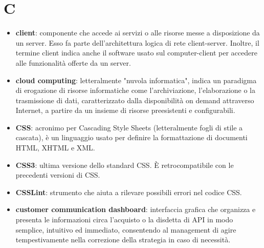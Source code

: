\section{C}
\begin{itemize}
	\item \textbf{client}: componente che accede ai servizi o alle risorse messe a disposizione da un server. Esso fa parte dell'architettura logica di rete client-server. Inoltre, il termine client indica anche il software usato sul computer-client per accedere alle funzionalità offerte da un server.
	\item \textbf{cloud computing}: letteralmente "nuvola informatica", indica un paradigma di erogazione di risorse informatiche come l'archiviazione, l'elaborazione o la trasmissione di dati, caratterizzato dalla disponibilità on demand attraverso Internet, a partire da un insieme di risorse preesistenti e configurabili.
	\item \textbf{CSS}: acronimo per Cascading Style Sheets (letteralmente fogli di stile a cascata), è un linguaggio usato per definire la formattazione di documenti HTML, XHTML e XML.
	\item \textbf{CSS3}: ultima versione dello standard CSS. \MakeUppercase{è} retrocompatibile con le precedenti versioni di CSS.
	\item \textbf{CSSLint}: strumento che aiuta a rilevare possibili errori nel codice CSS.
	\item \textbf{customer communication dashboard}: interfaccia grafica che organizza e presenta le informazioni circa l'acquisto o la disdetta di API in modo semplice, intuitivo ed immediato, consentendo al management di agire tempestivamente nella correzione della strategia in caso di necessità.
\end{itemize}